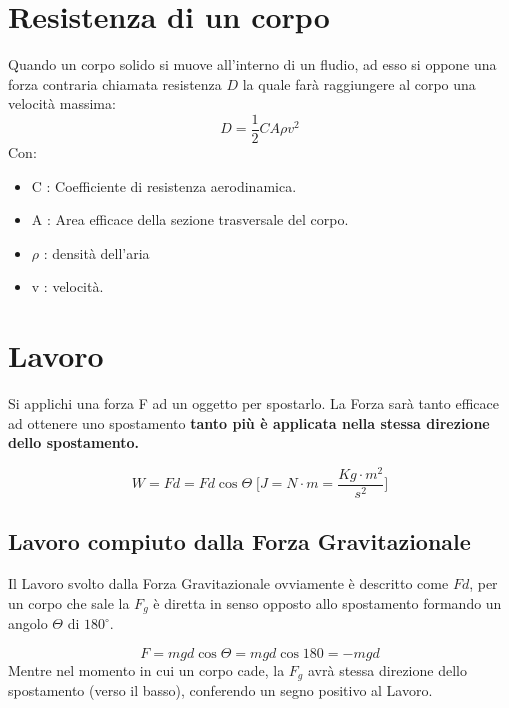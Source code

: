     \section{Resistenza di un corpo} Quando un corpo solido si muove 
    all'interno di un fludio, ad esso si oppone una forza contraria chiamata
    resistenza $D$ la quale farà raggiungere al corpo una velocità massima:
        \begin{equation}
            D = \frac{1}{2}CA\rho v^2
        \end{equation}
        Con:
        \begin{itemize}
            \item C : Coefficiente di resistenza aerodinamica.
            \item A : Area efficace della sezione trasversale del corpo.
            \item $\rho$ : densità dell'aria
            \item v : velocità.
        \end{itemize}

    \section{Lavoro} Si applichi una forza F ad un oggetto per spostarlo. La 
    Forza sarà tanto efficace ad ottenere uno spostamento \textbf{tanto più
    è applicata nella stessa direzione dello spostamento.}

        \begin{equation}
            W = Fd = Fd \cos \Theta \;\Bigg[J = N \cdot m = 
            \frac{Kg \cdot m^2}{s^2}\Bigg]
        \end{equation}

        \subsection{Lavoro compiuto dalla Forza Gravitazionale} Il Lavoro svolto 
        dalla Forza Gravitazionale ovviamente è descritto come $F d$, per un 
        corpo che sale la $F_g$ è diretta in senso opposto allo spostamento 
        formando un angolo $\Theta$ di $180^{\circ}$.
        
        \begin{equation}
            F = mgd\cos \Theta = mgd \cos 180 = - mgd
        \end{equation}
        Mentre nel momento in cui un corpo cade, la $F_g$ avrà stessa direzione
        dello spostamento (verso il basso), conferendo un segno positivo al
        Lavoro.
        
